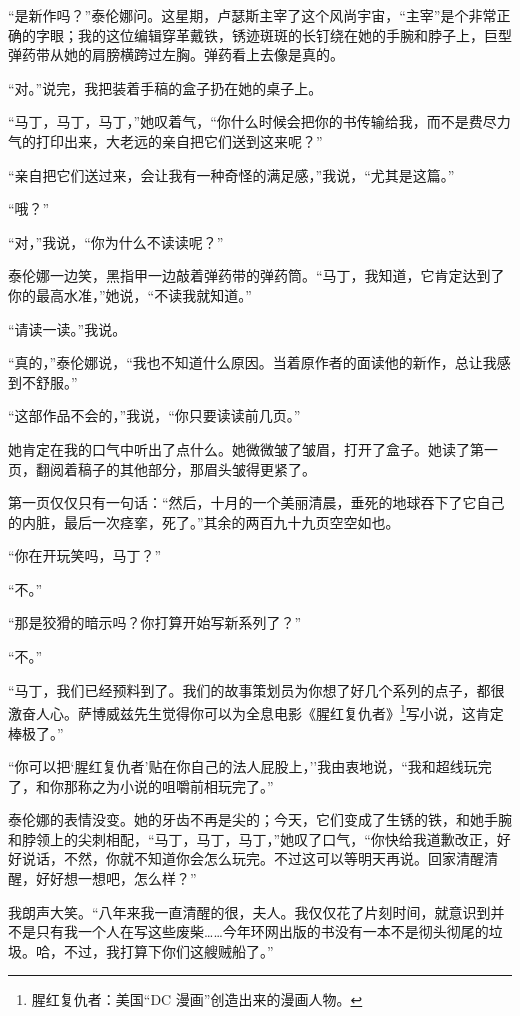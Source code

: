 \documentclass[AutoFakeBold=true]{book}
\begin{document}
``是新作吗？''泰伦娜问。这星期，卢瑟斯主宰了这个风尚宇宙，``主宰''是个非常正确的字眼；我的这位编辑穿革戴铁，锈迹斑斑的长钉绕在她的手腕和脖子上，巨型弹药带从她的肩膀横跨过左胸。弹药看上去像是真的。

``对。''说完，我把装着手稿的盒子扔在她的桌子上。

``马丁，马丁，马丁，''她叹着气，``你什么时候会把你的书传输给我，而不是费尽力气的打印出来，大老远的亲自把它们送到这来呢？''

``亲自把它们送过来，会让我有一种奇怪的满足感，''我说，``尤其是这篇。''

``哦？''

``对，''我说，``你为什么不读读呢？''

泰伦娜一边笑，黑指甲一边敲着弹药带的弹药筒。``马丁，我知道，它肯定达到了你的最高水准，''她说，``不读我就知道。''

``请读一读。''我说。

``真的，''泰伦娜说，``我也不知道什么原因。当着原作者的面读他的新作，总让我感到不舒服。''

``这部作品不会的，''我说，``你只要读读前几页。''

她肯定在我的口气中听出了点什么。她微微皱了皱眉，打开了盒子。她读了第一页，翻阅着稿子的其他部分，那眉头皱得更紧了。

第一页仅仅只有一句话：``然后，十月的一个美丽清晨，垂死的地球吞下了它自己的内脏，最后一次痉挛，死了。''其余的两百九十九页空空如也。

``你在开玩笑吗，马丁？''

``不。''

``那是狡猾的暗示吗？你打算开始写新系列了？''

``不。''

``马丁，我们已经预料到了。我们的故事策划员为你想了好几个系列的点子，都很激奋人心。萨博威兹先生觉得你可以为全息电影《腥红复仇者》\footnote{腥红复仇者：美国``DC 漫画''创造出来的漫画人物。}写小说，这肯定棒极了。''

``你可以把`腥红复仇者'贴在你自己的法人屁股上，''我由衷地说，``我和超线玩完了，和你那称之为小说的咀嚼前相玩完了。''

泰伦娜的表情没变。她的牙齿不再是尖的；今天，它们变成了生锈的铁，和她手腕和脖领上的尖刺相配，``马丁，马丁，马丁，''她叹了口气，``你快给我道歉改正，好好说话，不然，你就不知道你会怎么玩完。不过这可以等明天再说。回家清醒清醒，好好想一想吧，怎么样？''

我朗声大笑。``八年来我一直清醒的很，夫人。我仅仅花了片刻时间，就意识到并不是只有我一个人在写这些废柴……今年环网出版的书没有一本不是彻头彻尾的垃圾。哈，不过，我打算下你们这艘贼船了。''
\end{document}
